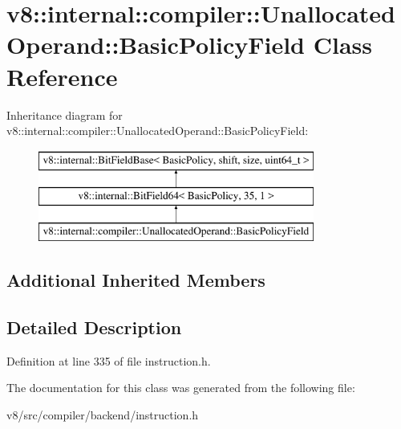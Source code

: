 \hypertarget{classv8_1_1internal_1_1compiler_1_1UnallocatedOperand_1_1BasicPolicyField}{}\section{v8\+:\+:internal\+:\+:compiler\+:\+:Unallocated\+Operand\+:\+:Basic\+Policy\+Field Class Reference}
\label{classv8_1_1internal_1_1compiler_1_1UnallocatedOperand_1_1BasicPolicyField}
Inheritance diagram for v8\+:\+:internal\+:\+:compiler\+:\+:Unallocated\+Operand\+:\+:Basic\+Policy\+Field\+:\begin{figure}[H]
\begin{center}
\leavevmode
\includegraphics[height=3.000000cm]{classv8_1_1internal_1_1compiler_1_1UnallocatedOperand_1_1BasicPolicyField}
\end{center}
\end{figure}
\subsection*{Additional Inherited Members}


\subsection{Detailed Description}


Definition at line 335 of file instruction.\+h.



The documentation for this class was generated from the following file\+:\begin{DoxyCompactItemize}
\item 
v8/src/compiler/backend/instruction.\+h\end{DoxyCompactItemize}
